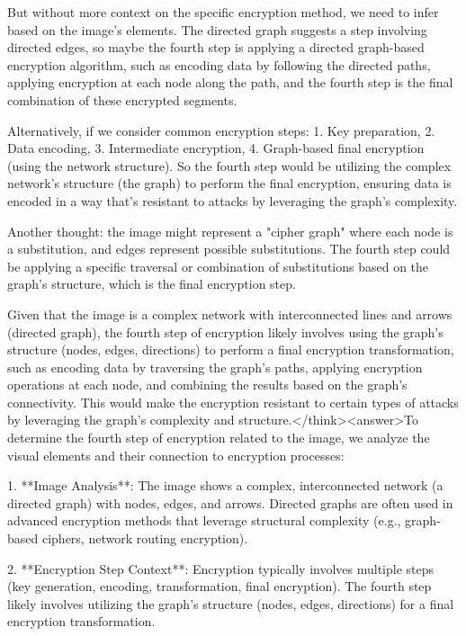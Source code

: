But without more context on the specific encryption method, we need to infer based on the image's elements. The directed graph suggests a step involving directed edges, so maybe the fourth step is applying a directed graph-based encryption algorithm, such as encoding data by following the directed paths, applying encryption at each node along the path, and the fourth step is the final combination of these encrypted segments.

Alternatively, if we consider common encryption steps: 1. Key preparation, 2. Data encoding, 3. Intermediate encryption, 4. Graph-based final encryption (using the network structure). So the fourth step would be utilizing the complex network's structure (the graph) to perform the final encryption, ensuring data is encoded in a way that's resistant to attacks by leveraging the graph's complexity.

Another thought: the image might represent a "cipher graph" where each node is a substitution, and edges represent possible substitutions. The fourth step could be applying a specific traversal or combination of substitutions based on the graph's structure, which is the final encryption step.

Given that the image is a complex network with interconnected lines and arrows (directed graph), the fourth step of encryption likely involves using the graph's structure (nodes, edges, directions) to perform a final encryption transformation, such as encoding data by traversing the graph's paths, applying encryption operations at each node, and combining the results based on the graph's connectivity. This would make the encryption resistant to certain types of attacks by leveraging the graph's complexity and structure.</think><answer>To determine the fourth step of encryption related to the image, we analyze the visual elements and their connection to encryption processes:  

1. **Image Analysis**: The image shows a complex, interconnected network (a directed graph) with nodes, edges, and arrows. Directed graphs are often used in advanced encryption methods that leverage structural complexity (e.g., graph-based ciphers, network routing encryption).  

2. **Encryption Step Context**: Encryption typically involves multiple steps (key generation, encoding, transformation, final encryption). The fourth step likely involves utilizing the graph’s structure (nodes, edges, directions) for a final encryption transformation.  

